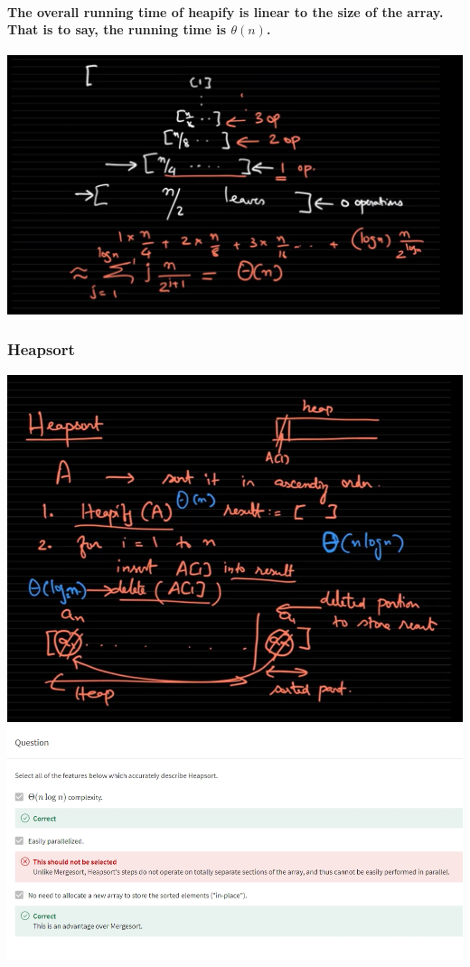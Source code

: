 \documentclass{article}
\begin{document}
\paragraph{The overall running time of heapify is linear to the size of the array. That is to say, the running time is $\theta(n)$.\\}


\includegraphics[width=\textwidth]{heapifyrunningtime.png}



\subsubsection{Heapsort}

\includegraphics[width=\textwidth]{heapsort.png}
\includegraphics[width=\textwidth]{questionofheapsort.png}
\end{document}
